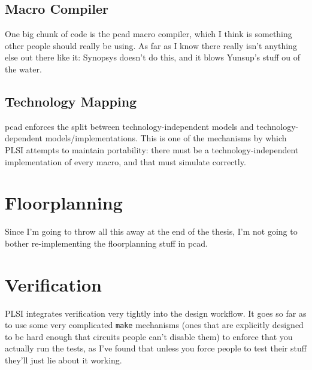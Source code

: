\documentclass{article}
\begin{document}
\subsection{Macro Compiler}

One big chunk of code is the pcad macro compiler, which I think is something
other people should really be using.  As far as I know there really isn't
anything else out there like it: Synopsys doesn't do this, and it blows
Yunsup's stuff ou of the water.

\subsection{Technology Mapping}

pcad enforces the split between technology-independent models and
technology-dependent models/implementations.  This is one of the mechanisms
by which PLSI attempts to maintain portability: there must be a
technology-independent implementation of every macro, and that must simulate
correctly.

\section{Floorplanning}

Since I'm going to throw all this away at the end of the thesis, I'm not
going to bother re-implementing the floorplanning stuff in pcad.

\section{Verification}

PLSI integrates verification very tightly into the design workflow.  It goes
so far as to use some very complicated \texttt{make} mechanisms (ones that are
explicitly designed to be hard enough that circuits people can't disable
them) to enforce that you actually run the tests, as I've found that unless
you force people to test their stuff they'll just lie about it working.
\end{document}
